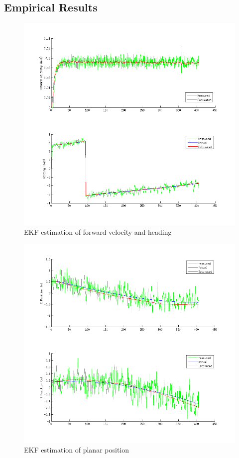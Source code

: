 \documentclass[11pt]{article} %
\begin{document}
\clearpage

\subsection{Empirical Results}

\begin{figure} [hbt]
 \centering
 \includegraphics[scale=0.65]{ekf_meas_vh.png} 
 \caption{EKF estimation of forward velocity and heading}
 \label{ekf_m_vh}
\end{figure}

\begin{figure} [hbt]
 \centering
 \includegraphics[scale=0.65]{ekf_meas_xy.png}
 \caption{EKF estimation of planar position}
 \label{ekf_m_xy}
\end{figure}
\end{document}
